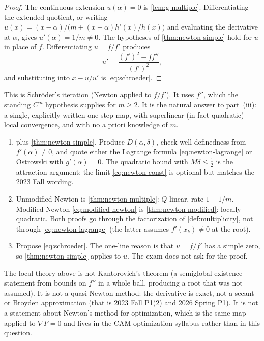 \begin{proof}
The continuous extension \(u(\alpha)=0\) is \cref{lem:g-multiple}. Differentiating the extended quotient, or writing \(u(x)=(x-\alpha)/\bigl(m+(x-\alpha)h'(x)/h(x)\bigr)\) and evaluating the derivative at \(\alpha\), gives \(u'(\alpha)=1/m\neq 0\). The hypotheses of \cref{thm:newton-simple} hold for \(u\) in place of \(f\). Differentiating \(u=f/f'\) produces
\[
u'
=
\frac{(f')^2-f f''}{(f')^2},
\]
and substituting into \(x-u/u'\) is \eqref{eq:schroeder}.
\end{proof}

This is Schr\"oder's iteration (Newton applied to \(f/f'\)). It uses \(f''\), which the standing \(C^m\) hypothesis supplies for \(m\ge 2\). It is the natural answer to part~(iii): a single, explicitly written one-step map, with superlinear (in fact quadratic) local convergence, and with no a priori knowledge of \(m\).

\begin{examnote}
\label{examnote:p2}
\begin{enumerate}[label=\textup{(\roman*)}]
    \item {} plus \cref{thm:newton-simple}. Produce \(D(\alpha,\delta)\), check well-definedness from \(f'(\alpha)\neq 0\), and quote either the Lagrange formula \eqref{eq:newton-lagrange} or Ostrowski with \(g'(\alpha)=0\). The quadratic bound with \(M\delta\le\tfrac12\) is the attraction argument; the limit \eqref{eq:newton-const} is optional but matches the 2023 Fall wording.
    \item Unmodified Newton is \cref{thm:newton-multiple}: \(Q\)-linear, rate \(1-1/m\). Modified Newton \eqref{eq:modified-newton} is \cref{thm:newton-modified}: locally quadratic. Both proofs go through the factorization of \cref{def:multiplicity}, not through \eqref{eq:newton-lagrange} (the latter assumes \(f'(x_k)\neq 0\) at the root).
    \item Propose \eqref{eq:schroeder}. The one-line reason is that \(u=f/f'\) has a simple zero, so \cref{thm:newton-simple} applies to \(u\). The exam does not ask for the proof.
\end{enumerate}
\end{examnote}

\begin{remark}
\label{rem:newton-not}
The local theory above is not Kantorovich's theorem (a semiglobal existence statement from bounds on \(f''\) in a whole ball, producing a root that was not assumed). It is not a quasi-Newton method: the derivative is exact, not a secant or Broyden approximation (that is 2023 Fall P1(2) and 2026 Spring P1). It is not a statement about Newton's method for optimization, which is the same map applied to \(\nabla F=0\) and lives in the CAM optimization syllabus rather than in this question.
\end{remark}
